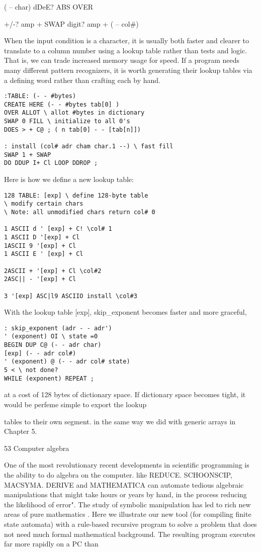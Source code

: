 ( -- char) dDeE? ABS OVER

+/-? amp + SWAP
digit? amp + ( -- col\#)


When the input condition is a character, it is usually both faster
and clearer to translate to a column number using a lookup table
rather than tests and logic. That is, we can trade increased
memory usage for speed. If a program needs many different
pattern recognizers, it is worth generating their lookup tables via
a defining word rather than crafting each by hand.
\begin{verbatim}
:TABLE: (- - #bytes)
CREATE HERE (- - #bytes tab[0] )
OVER ALLOT \ allot #bytes in dictionary
SWAP 0 FILL \ initialize to all 0's
DOES > + C@ ; ( n tab[0] - - [tab[n]])

: install (col# adr cham char.1 --) \ fast fill
SWAP 1 + SWAP
DO DDUP I+ Cl LOOP DDROP ;
\end{verbatim}
Here is how we define a new lookup table:
\begin{verbatim}
128 TABLE: [exp] \ define 128-byte table
\ modify certain chars
\ Note: all unmodified chars return col# 0

1 ASCII d ' [exp] + C! \col# 1
1 ASCII D '[exp] + Cl
1ASCII 9 '[exp] + Cl
1 ASCII E ' [exp] + Cl

2ASCII + '[exp] + Cl \col#2
2ASC|| - '[exp] + Cl

3 '[exp] ASC|l9 ASCIIO install \col#3
\end{verbatim}
With the lookup table [exp], skip\_exponent becomes faster
and more graceful,

\begin{verbatim}
: skip_exponent (adr - - adr')
' (exponent) OI \ state =0
BEGIN DUP C@ (- - adr char)
[exp] (- - adr col#)
' (exponent) @ (- - adr col# state)
5 < \ not done?
WHILE (exponent) REPEAT ;
\end{verbatim}

at a cost of 128 bytes of dictionary space. If dictionary space becomes tight, it would be perfeme simple to export the lookup

tables to their own segment. in the same way we did with generic arrays in Chapter 5.

53 Computer algebra

One of the most revolutionary recent developments in scientiﬁc
programming is the ability to do algebra on the computer.
like REDUCE. SCHOONSCIP, MACSYMA.
DERIVE and MATHEMATICA can automate tedious algebraic
manipulations that might take hours or years by hand, in the
process reducing the likelihood of error". The study of symbolic
manipulation has led to rich new areas of pure mathematics .
Here we illustrate our new tool (for compiling ﬁnite state
automata) with a rule-based recursive program to solve a problem that does not need much formal mathematical background. The resulting program executes far more rapidly on a PC than

